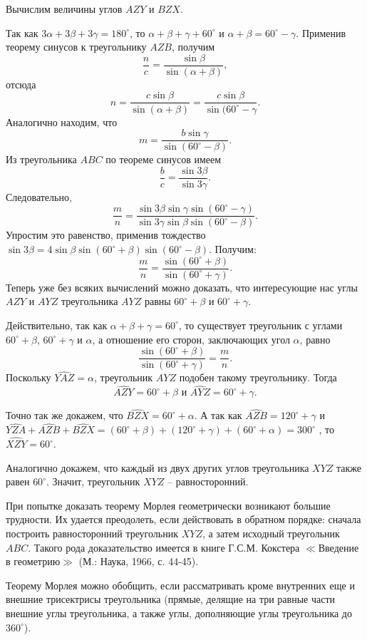 \documentclass{article}
\begin{document}
\par Вычислим величины углов $AZY$ и $BZX$. 
\par Так как $3\alpha+3\beta+3\gamma=180^{\circ}$, то $\alpha+\beta+\gamma+60^{\circ}$ и $\alpha+\beta=60^{\circ}-\gamma$. Применив теорему синусов к треугольнику $AZB$, получим $$\frac{n}{c} =\frac{\sin\beta}{\sin(\alpha+\beta)},$$
отсюда $$n=\frac{c\sin\beta}{\sin(\alpha+\beta)}=\frac{c\sin\beta}{\sin(60^{\circ}-\gamma}.$$
Аналогично находим, что $$m=\frac{b\sin\gamma}{\sin(60^{\circ}-\beta)}.$$
Из треугольника $ABC$ по теореме синусов  имеем $$\frac{b}{c}=\frac{\sin3\beta}{\sin 3\gamma}.$$
Следовательно, $$\frac{m}{n}=\frac{\sin3\beta\sin\gamma\sin(60^{\circ}-\gamma)}{\sin 3\gamma\sin\beta\sin(60^{\circ}-\beta)}.$$
Упростим это равенство, применив тождество $\sin 3 \beta=4 \sin \beta \sin(60^{\circ}+\beta)\sin(60^{\circ}-\beta)$. Получим: $$ \frac{m}{n}=\frac{\sin(60^{\circ}+\beta)}{\sin(60^{\circ}+\gamma)}.$$
Теперь уже без всяких вычислений можно доказать, что интересующие нас углы $AZY$ и $AYZ$ треугольника $AYZ$ равны $60^{\circ}+\beta$ и $60^{\circ}+\gamma$.
\par Действительно, так как $\alpha+\beta+\gamma=60^{\circ}$, то существует треугольник с углами $60^{\circ}+\beta$, $60^{\circ}+\gamma$ и $\alpha$, а отношение его сторон, заключающих угол $\alpha$, равно $$\frac{\sin(60^{\circ}+\beta)}{\sin(60^{\circ}+\gamma)}=\frac{m}{n}.$$
Поскольку $\widehat{YAZ}=\alpha$, треугольник $AYZ$ подобен такому треугольнику. Тогда $$\widehat{AZY}=60^{\circ}+\beta \mbox{ и } \widehat{AYZ}=60^{\circ}+\gamma.$$
\par Точно так же докажем, что $\widehat{BZX}=60^{\circ}+\alpha$.  А так как $\widehat{AZB}=120^{\circ}+\gamma$ и $\widehat{YZA}+\widehat{AZB}+\widehat{BZX}=(60^{\circ}+\beta)+(120^{\circ}+\gamma)+(60^{\circ}+\alpha)=300^{\circ}$
, то    $\widehat{XZY}=60^{\circ}.$ 
\par Аналогично докажем, что каждый из двух других углов треугольника $XYZ$ также равен $60^{\circ}$. Значит, треугольник $XYZ$ -- равносторонний.
\par При попытке доказать теорему Морлея геометрически возникают большие трудности. Их удается преодолеть, если действовать в обратном порядке: сначала построить равносторонний треугольник $XYZ$, а затем исходный треугольник $ABC$. Такого рода доказательство имеется в книге Г.С.М. Кокстера  $\ll$Введение в геометрию$\gg$ (М.: Наука, 1966, с. 44-45).
\par Теорему Морлея можно обобщить, если рассматривать кроме внутренних еще и внешние трисектрисы треугольника (прямые, делящие на три равные части внешние углы треугольника, а также углы, дополняющие углы треугольника до $360^{\circ}$).
\end{document}
